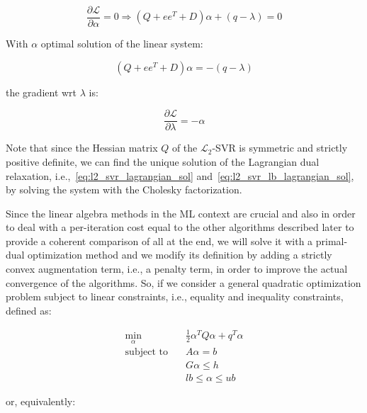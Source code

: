 \begin{equation} \label{eq:l2_svr_lb_lagrangian_der_a}
	\frac{\partial \mathcal{L}}{\partial \alpha}=0\Rightarrow (Q + ee^T + D) \alpha + (q - \lambda) = 0
\end{equation}

With $\alpha$ optimal solution of the linear system:

\begin{equation} \label{eq:l2_svr_lb_lagrangian_sol}
    (Q + ee^T + D) \alpha = - (q - \lambda)
\end{equation}

the gradient wrt $\lambda$ is:

\begin{equation} \label{eq:l2_svr_lb_lagrangian_der_l}
    \frac{\partial \mathcal{L}}{\partial \lambda}=-\alpha
\end{equation}

\bigskip

Note that since the Hessian matrix $Q$ of the $\mathcal{L}_2$-SVR is symmetric and strictly positive definite, we can find the unique solution of the Lagrangian dual relaxation, i.e.,~\ref{eq:l2_svr_lagrangian_sol} and~\ref{eq:l2_svr_lb_lagrangian_sol}, by solving the system with the Cholesky factorization.

\bigskip

Since the linear algebra methods in the ML context are crucial and also in order to deal with a per-iteration cost equal to the other algorithms described later to provide a coherent comparison of all at the end, we will solve it with a primal-dual optimization method and we modify its definition by adding a strictly convex augmentation term, i.e., a penalty term, in order to improve the actual convergence of the algorithms. So, if we consider a general quadratic optimization problem subject to linear constraints, i.e., equality and inequality constraints, defined as:

\begin{equation}
    \begin{aligned} 
        \min_{\alpha} \quad & \frac{1}{2} \alpha^T Q \alpha + q^T \alpha \\
            \textrm{subject to} \quad & A \alpha = b \\ & G \alpha \leq h \\ & lb \leq \alpha \leq ub
    \end{aligned}
\end{equation}

or, equivalently:

